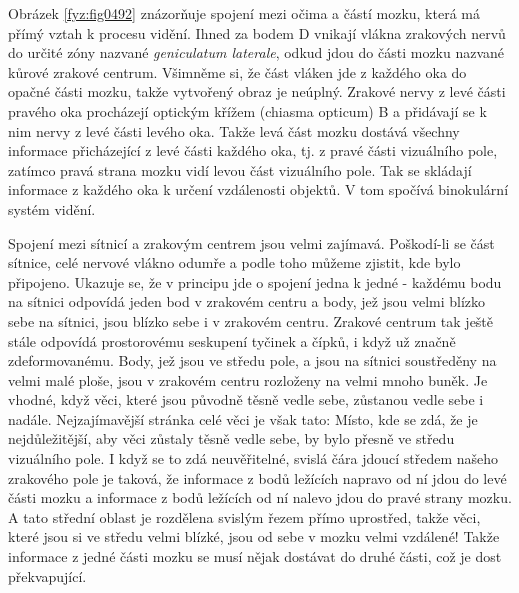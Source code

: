     Obrázek \ref{fyz:fig0492} znázorňuje spojení mezi očima a částí mozku, která má přímý vztah k
    procesu vidění. Ihned za bodem D vnikají vlákna zrakových nervů do určité zóny nazvané
    \emph{geniculatum laterale}, odkud jdou do části mozku nazvané kůrové zrakové centrum. Všimněme
    si, že část vláken jde z každého oka do opačné části mozku, takže vytvořený obraz je neúplný.
    Zrakové nervy z levé části pravého oka procházejí optickým křížem (chiasma opticum) B a
    přidávají se k nim nervy z levé části levého oka. Takže levá část mozku dostává všechny
    informace přicházející z levé části každého oka, tj. z pravé části vizuálního pole, zatímco
    pravá strana mozku vidí levou část vizuálního pole. Tak se skládají informace z každého oka k
    určení vzdálenosti objektů. V tom spočívá binokulární systém vidění.

    Spojení mezi sítnicí a zrakovým centrem jsou velmi zajímavá. Poškodí-li se část sítnice, celé
    nervové vlákno odumře a podle toho můžeme zjistit, kde bylo připojeno. Ukazuje se, že v principu
    jde o spojení jedna k jedné - každému bodu na sítnici odpovídá jeden bod v zrakovém centru a
    body, jež jsou velmi blízko sebe na sítnici, jsou blízko sebe i v zrakovém centru. Zrakové
    centrum tak ještě stále odpovídá prostorovému seskupení tyčinek a čípků, i když už značně
    zdeformovanému. Body, jež jsou ve středu pole, a jsou na sítnici soustředěny na velmi malé
    ploše, jsou v zrakovém centru rozloženy na velmi mnoho buněk. Je vhodné, když věci, které jsou
    původně těsně vedle sebe, zůstanou vedle sebe i nadále. Nejzajímavější stránka celé věci je však
    tato: Místo, kde se zdá, že je nejdůležitější, aby věci zůstaly těsně vedle sebe, by bylo přesně
    ve středu vizuálního pole. I když se to zdá neuvěřitelné, svislá čára jdoucí středem našeho
    zrakového pole je taková, že informace z bodů ležících napravo od ní jdou do levé části mozku a
    informace z bodů ležících od ní nalevo jdou do pravé strany mozku. A tato střední oblast je
    rozdělena svislým řezem přímo uprostřed, takže věci, které jsou si ve středu velmi blízké, jsou
    od sebe v mozku velmi vzdálené! Takže informace z jedné části mozku se musí nějak dostávat do
    druhé části, což je dost překvapující.

